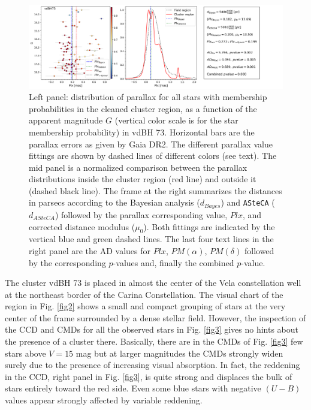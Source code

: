 \documentclass[draft]{aa}
\begin{document}
\begin{figure}[ht]
    \centering
    \includegraphics[width=\hsize]{../figs/plx_vdBH73.png}
    \caption{Left panel: distribution of parallax for all stars with membership
    probabilities in the cleaned cluster region, as a function of the apparent
    magnitude $G$ (vertical color scale is for the star membership
    probability) in vdBH 73.
    Horizontal bars are the parallax errors as given by Gaia DR2. The different
    parallax value fittings are shown by dashed lines of different colors (see
    text). The mid panel is a normalized comparison between the parallax
    distributions inside the cluster region (red line) and outside it (dashed
    black line). The frame at the right summarizes the distances in parsecs
    according to the Bayesian analysis ($d_{Bayes}$) and \texttt{ASteCA} ($d_
    {ASteCA}$) followed by the parallax corresponding value, $Plx$, and
    corrected distance modulus ($\mu_0$). Both fittings are indicated by the
    vertical blue and green dashed lines. The last four text lines in the right
    panel are the AD values for $Plx$, $PM(\alpha)$, $PM(\delta)$ followed by
    the corresponding $p$-values and, finally the combined $p$-value.}
    \label{fig6}
\end{figure}

The cluster vdBH 73 is placed in almost the center of the Vela
constellation well at the northeast border of the Carina Constellation. The
visual chart of the region in Fig. \ref{fig2} shows a small and compact grouping
of stars at the very center of the frame surrounded by a dense stellar field.
However, the inspection of the CCD and CMDs for all the observed stars in
Fig. \ref{fig3} gives no hints about the presence of a
cluster there. Basically, there are in the CMDs of Fig. \ref{fig3} few stars
above $V=15$ mag but at larger magnitudes the CMDs strongly widen surely due to
the presence of increasing visual absorption. In fact, the reddening in the
CCD, right panel in Fig. \ref{fig3}, is quite strong and displaces the bulk of
stars entirely toward the red side. Even some blue stars with negative $(U-B)$
values appear strongly affected by variable reddening.\\
\end{document}
